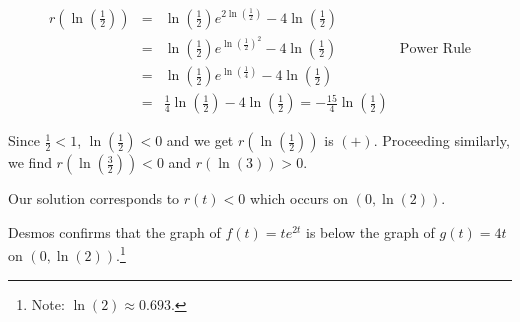 \documentclass{ximera}
\begin{document}
\begin{example}
\begin{explanation}
\begin{enumerate}
\[\begin{array}{rclr}

r\left(\ln\left(\frac{1}{2}\right)\right) & = & \ln\left(\frac{1}{2}\right) e^{2\ln\left(\frac{1}{2}\right)} - 4\ln\left(\frac{1}{2}\right) & \\

&= & \ln\left(\frac{1}{2}\right)e^{\ln\left(\frac{1}{2}\right)^2}- 4\ln\left(\frac{1}{2}\right) & \text{Power Rule} \\

& = & \ln\left(\frac{1}{2}\right)e^{\ln\left(\frac{1}{4}\right)}- 4\ln\left(\frac{1}{2}\right) & \\

& = & \frac{1}{4}  \ln\left(\frac{1}{2}\right) - 4  \ln\left(\frac{1}{2}\right) =  -\frac{15}{4} \ln\left(\frac{1}{2}\right) & \end{array}\] 

Since $\frac{1}{2} < 1$, $ \ln\left(\frac{1}{2}\right) < 0$ and we get $r(\ln\left(\frac{1}{2}\right))$ is $(+)$.  Proceeding similarly, we find $r\left(\ln\left(\frac{3}{2}\right)\right)  < 0$ and $r(\ln(3)) > 0$. 

\begin{image}
% 
\end{image}

 Our solution corresponds to $r(t) < 0$ which occurs on $(0 ,\ln(2))$.  

Desmos confirms that the graph of $f(t) = t e^{2t} $ is below the graph of $g(t) = 4t$ on $(0 ,\ln(2))$.\footnote{Note: $\ln(2) \approx 0.693$.}

\begin{center}
\end{center}

\end{enumerate}
\end{explanation}


\end{example}
\end{document}
